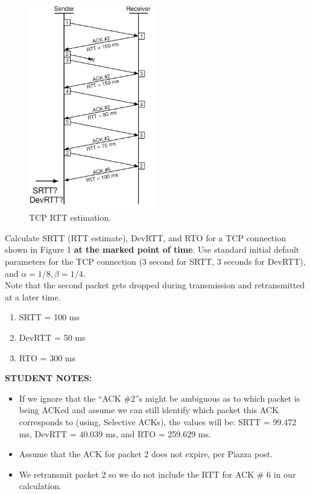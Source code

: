 \documentclass{report}
\begin{document}
\mktitle


\begin{problem}
\begin{figure}[!ht]
	\centering
	\includegraphics[valign=T,width=0.5\textwidth]{image1.png}
	\caption{TCP RTT estimation.}
	\centering
	\label{fig:image1}
\end{figure}

Calculate SRTT (RTT estimate), DevRTT, and RTO for a TCP connection shown in
Figure 1 \textbf{at the marked point of time}. Use standard initial default
parameters for the TCP connection (3 second for SRTT, 3 seconds for DevRTT),
and $\alpha = 1/8, \beta = 1/4$.\\
\indent Note that the second packet gets dropped during transmission and
retransmitted at a later time.

\begin{enumerate}
	\item SRTT = 100 ms
	\item DevRTT = 50 ms
	\item RTO = 300 ms
\end{enumerate}

\textbf{STUDENT NOTES:}
\begin{itemize}
  \item If we ignore that the ``ACK \#2''s might be ambiguous as to which
packet is being ACKed and assume we can still identify which packet this ACK
corresponds to (using, Selective ACKs), the values will be: SRTT = 99.472 ms,
DevRTT = 40.039 ms, and RTO = 259.629 ms.
  \item Assume that the ACK for packet 2 does not expire, per Piazza post.
  \item We retransmit packet 2 so we do not include the RTT for ACK \# 6
in our calculation.
\end{itemize}

\end{problem}
\end{document}
